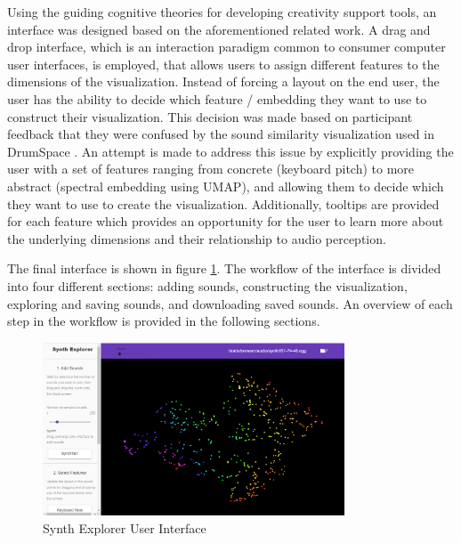 Using the guiding cognitive theories for developing creativity support tools, an interface was designed based on the aforementioned related work. A drag and drop interface, which is an interaction paradigm common to consumer computer user interfaces, is employed, that allows users to assign different features to the dimensions of the visualization. Instead of forcing a layout on the end user, the user has the ability to decide which feature / embedding they want to use to construct their visualization. This decision was made based on participant feedback that they were confused by the sound similarity visualization used in DrumSpace \cite{turquois2016exploring}. An attempt is made to address this issue by explicitly providing the user with a set of features ranging from concrete (keyboard pitch) to more abstract (spectral embedding using UMAP), and allowing them to decide which they want to use to create the visualization. Additionally, tooltips are provided for each feature which provides an opportunity for the user to learn more about the underlying dimensions and their relationship to audio perception.

The final interface is shown in figure \ref{fig:ui_1}. %
The workflow of the interface is divided into four different sections: adding sounds, constructing the visualization, exploring and saving sounds, and downloading saved sounds. An overview of each step in the workflow is provided in the following sections.
\vspace{1cm}
\begin{figure}[ht]
    \centering
    \includegraphics[width=0.8\textwidth]{SynthExplore Init.png}
    \caption{Synth Explorer User Interface}
    \label{fig:ui_1}
\end{figure}


